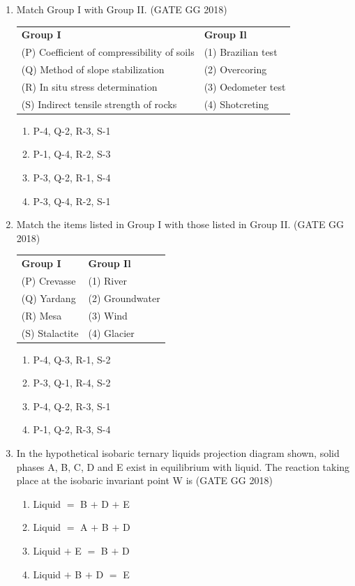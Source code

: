 \documentclass[journal]{IEEEtran}
\begin{document}
\begin{enumerate}[start=1]
\item Match Group I with Group II.
\hfill(GATE GG 2018)\\
\begin{tabular}{ l l }
\textbf{Group I} & \textbf{Group Il}\\
(P) Coefficient of compressibility of soils & (1) Brazilian test\\
(Q) Method of slope stabilization & (2) Overcoring\\
(R) In situ stress determination & (3) Oedometer test\\
(S) Indirect tensile strength of rocks & (4) Shotcreting  
\end{tabular}
\begin{multicols}{2}
\begin{enumerate}
\item P-4, Q-2, R-3, S-1
\item P-1, Q-4, R-2, S-3
\item P-3, Q-2, R-1, S-4
\item P-3, Q-4, R-2, S-1
\end{enumerate}
\end{multicols}

\item Match the items listed in Group I with those listed in Group II.
\hfill(GATE GG 2018)\\
\begin{tabular}{ l l }
\textbf{Group I} & \textbf{Group Il}\\
(P) Crevasse &  (1) River\\
(Q) Yardang &  (2) Groundwater\\
 (R) Mesa & (3) Wind\\
 (S) Stalactite & (4) Glacier
\end{tabular}
\begin{multicols}{2}
\begin{enumerate}
\item P-4, Q-3, R-1, S-2
\item P-3, Q-1, R-4, S-2
\item P-4, Q-2, R-3, S-1
\item P-1, Q-2, R-3, S-4
\end{enumerate}
\end{multicols}

\item In the hypothetical isobaric ternary liquids projection diagram shown, solid phases A, B, C, D and E exist in equilibrium with liquid. The reaction taking place at the isobaric invariant point W is 
\hfill(GATE GG 2018)
\begin{multicols}{2}
\begin{enumerate}
\item Liquid  $=$ B $+$ D $+$ E
\item Liquid   $=$ A $+$ B $+$ D
\item Liquid  $+$ E $=$ B $+$ D
\item Liquid  $+$ B $+$ D $=$ E
\end{enumerate}
\end{multicols}


\end{enumerate}
\end{document}
